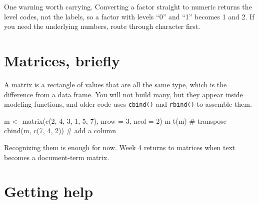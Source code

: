\documentclass[
  a4paper,
]{scrbook}
\newenvironment{Shaded}{\begin{snugshade}}{\end{snugshade}}
\newcommand{\AttributeTok}[1]{\textcolor[rgb]{0.40,0.45,0.13}{#1}}
\newcommand{\CommentTok}[1]{\textcolor[rgb]{0.37,0.37,0.37}{#1}}
\newcommand{\DecValTok}[1]{\textcolor[rgb]{0.68,0.00,0.00}{#1}}
\newcommand{\FunctionTok}[1]{\textcolor[rgb]{0.28,0.35,0.67}{#1}}
\newcommand{\NormalTok}[1]{\textcolor[rgb]{0.00,0.23,0.31}{#1}}
\newcommand{\OtherTok}[1]{\textcolor[rgb]{0.00,0.23,0.31}{#1}}
\newcommand{\SpecialCharTok}[1]{\textcolor[rgb]{0.37,0.37,0.37}{#1}}
\begin{document}
One warning worth carrying. Converting a factor straight to numeric
returns the level codes, not the labels, so a factor with levels ``0''
and ``1'' becomes 1 and 2. If you need the underlying numbers, route
through character first.

\begin{Shaded}
\end{Shaded}

\section*{Matrices, briefly}\label{matrices-briefly}


A matrix is a rectangle of values that are all the same type, which is
the difference from a data frame. You will not build many, but they
appear inside modeling functions, and older code uses \texttt{cbind()}
and \texttt{rbind()} to assemble them.

\begin{Shaded}
\begin{Highlighting}[]
\NormalTok{m }\OtherTok{\textless{}{-}} \FunctionTok{matrix}\NormalTok{(}\FunctionTok{c}\NormalTok{(}\DecValTok{2}\NormalTok{, }\DecValTok{4}\NormalTok{, }\DecValTok{3}\NormalTok{, }\DecValTok{1}\NormalTok{, }\DecValTok{5}\NormalTok{, }\DecValTok{7}\NormalTok{), }\AttributeTok{nrow =} \DecValTok{3}\NormalTok{, }\AttributeTok{ncol =} \DecValTok{2}\NormalTok{)}
\NormalTok{m}
\FunctionTok{t}\NormalTok{(m)               }\CommentTok{\# transpose}
\FunctionTok{cbind}\NormalTok{(m, }\FunctionTok{c}\NormalTok{(}\DecValTok{7}\NormalTok{, }\DecValTok{4}\NormalTok{, }\DecValTok{2}\NormalTok{))  }\CommentTok{\# add a column}
\end{Highlighting}
\end{Shaded}

Recognizing them is enough for now. Week 4 returns to matrices when text
becomes a document-term matrix.

\section*{Getting help}\label{getting-help}
\end{document}
